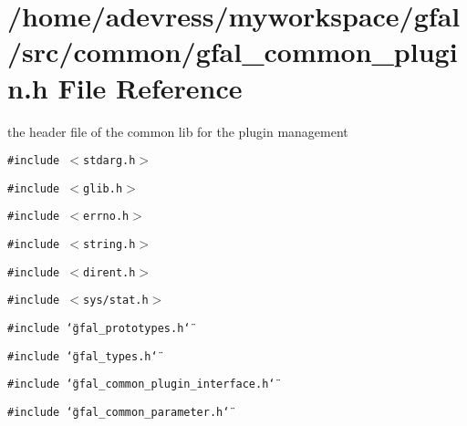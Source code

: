 \section{/home/adevress/myworkspace/gfal/src/common/gfal\_\-common\_\-plugin.h File Reference}
\label{gfal__common__plugin_8h}
the header file of the common lib for the plugin management 

{\tt \#include $<$stdarg.h$>$}\par
{\tt \#include $<$glib.h$>$}\par
{\tt \#include $<$errno.h$>$}\par
{\tt \#include $<$string.h$>$}\par
{\tt \#include $<$dirent.h$>$}\par
{\tt \#include $<$sys/stat.h$>$}\par
{\tt \#include \char`\"{}gfal\_\-prototypes.h\char`\"{}}\par
{\tt \#include \char`\"{}gfal\_\-types.h\char`\"{}}\par
{\tt \#include \char`\"{}gfal\_\-common\_\-plugin\_\-interface.h\char`\"{}}\par
{\tt \#include \char`\"{}gfal\_\-common\_\-parameter.h\char`\"{}}\par
